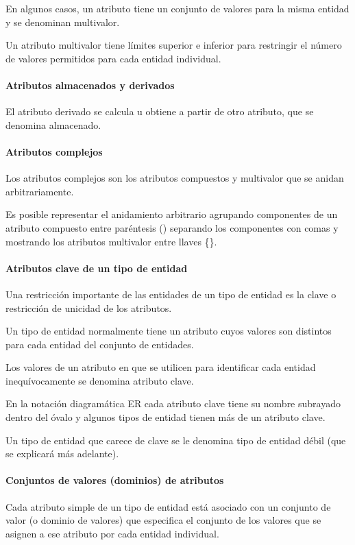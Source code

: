 En algunos casos, un atributo tiene un conjunto de valores para la misma entidad y se denominan multivalor.


Un atributo multivalor tiene límites superior e inferior para restringir el número de valores permitidos para cada entidad individual.


\paragraph*{Atributos almacenados y derivados}
El atributo derivado se calcula u obtiene a partir de otro atributo, que se denomina almacenado.


\paragraph*{Atributos complejos}

Los atributos complejos son los atributos compuestos y multivalor que se anidan arbitrariamente.

Es posible representar el anidamiento arbitrario agrupando componentes de un atributo compuesto entre paréntesis () separando los componentes con comas y mostrando los atributos multivalor entre llaves \{\}. 

\paragraph*{Atributos clave de un tipo de entidad}
Una restricción importante de las entidades de un tipo de entidad es la clave o restricción de unicidad de los atributos.


Un tipo de entidad normalmente tiene un atributo cuyos valores son distintos para cada entidad del conjunto de entidades.


Los valores de un atributo en que se utilicen para identificar cada entidad inequívocamente se denomina atributo clave.


En la notación diagramática ER cada atributo clave tiene su nombre subrayado dentro del óvalo y algunos tipos de entidad tienen más de un atributo clave. 


Un tipo de entidad que carece de clave se le denomina tipo de entidad débil (que se explicará más adelante).


\paragraph*{Conjuntos de valores (dominios) de atributos} Cada atributo simple de un tipo de entidad está asociado con un conjunto de valor (o dominio de valores) que especifica el conjunto de los valores que se asignen a ese atributo por cada entidad individual. 


